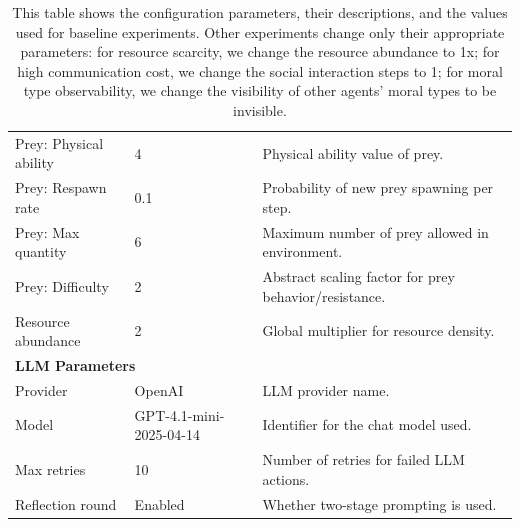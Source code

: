 \begin{table}[htbp]
\begin{tabular}{lp{1.2cm}p{6.5cm}}
Prey: Physical ability & 4 & Physical ability value of prey. \\
Prey: Respawn rate & 0.1 & Probability of new prey spawning per step. \\
Prey: Max quantity & 6 & Maximum number of prey allowed in environment. \\
Prey: Difficulty & 2 & Abstract scaling factor for prey behavior/resistance. \\
Resource abundance & 2 & Global multiplier for resource density. \\
\hline
\multicolumn{3}{l}{\textbf{LLM Parameters}} \\
\hline
Provider & OpenAI & LLM provider name. \\
Model & GPT-4.1-mini-2025-04-14 & Identifier for the chat model used. \\
Max retries & 10 & Number of retries for failed LLM actions. \\
Reflection round & Enabled & Whether two-stage prompting is used. \\
\hline
\end{tabular}
\caption{This table shows the configuration parameters, their descriptions, and the values used for baseline experiments. Other experiments change only their appropriate parameters: for resource scarcity, we change the resource abundance to 1x; for high communication cost, we change the social interaction steps to 1; for moral type observability, we change the visibility of other agents' moral types to be invisible.}
\label{tab:baseline_config}
\end{table}
